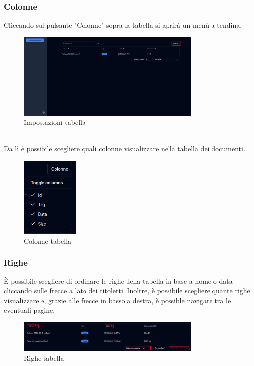 \subsubsection{Colonne}
Cliccando sul pulsante "Colonne" sopra la tabella si aprirà un menù a tendina. 
\begin{figure}[h!]
    \centering
    \includegraphics[width=0.8\textwidth]{schermatadocoloumns.png}
    \caption{Impostazioni tabella}\label{fig:settingtable}
\end{figure}
\\Da lì è possibile scegliere quali colonne visualizzare nella tabella dei documenti.
\begin{figure}[h!]
    \centering
    \includegraphics[width=0.25\textwidth]{visualizzacoldoc.png}
    \caption{Colonne tabella}\label{fig:coltable}
\end{figure}
\subsubsection{Righe}
È possibile scegliere di ordinare le righe della tabella in base a nome o data cliccando sulle frecce a lato dei titoletti. Inoltre, è possibile scegliere quante righe visualizzare e, grazie alle frecce in basso a destra, è possible navigare tra le eventuali pagine.
\begin{figure}[h!]
    \centering
    \includegraphics[width=0.8\textwidth]{visualizzaorderdoc.png}
    \caption{Righe tabella}\label{fig:rowtable}
\end{figure}
